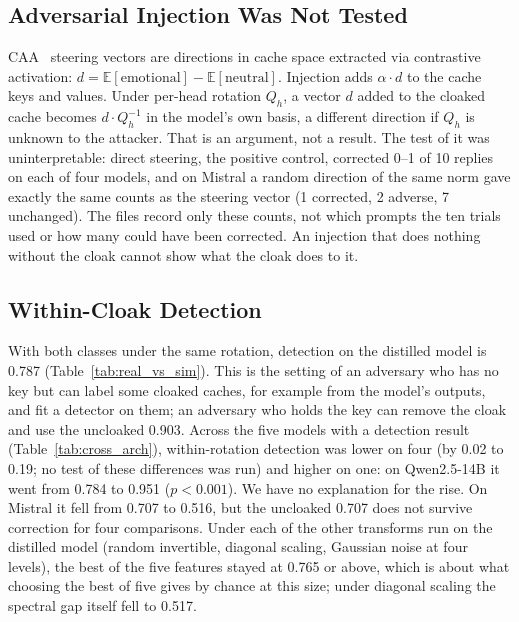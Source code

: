 \subsection{Adversarial Injection Was Not Tested}

CAA~\citep{panickssery2023caa} steering vectors are directions in cache space extracted via
contrastive activation: $d = \mathbb{E}[\text{emotional}] -
\mathbb{E}[\text{neutral}]$. Injection adds $\alpha \cdot d$ to the
cache keys and values. Under per-head rotation $Q_h$, a vector $d$ added
to the cloaked cache becomes $d \cdot Q_h^{-1}$ in the model's own basis,
a different direction if $Q_h$ is unknown to the attacker. That is an
argument, not a result. The test of it was uninterpretable: direct
steering, the positive control, corrected 0--1 of 10 replies on each of
four models, and on Mistral a random direction of the same norm gave
exactly the same counts as the steering vector (1 corrected, 2 adverse,
7 unchanged). The files record only these counts, not which prompts the
ten trials used or how many could have been corrected. An injection that
does nothing without the cloak cannot show what the cloak does to it.

\subsection{Within-Cloak Detection}
\label{sec:withincloak}

With both classes under the same rotation, detection on the distilled
model is 0.787 (Table~\ref{tab:real_vs_sim}). This is the setting of an
adversary who has no key but can label some cloaked caches, for example
from the model's outputs, and fit a detector on them; an adversary who
holds the key can remove the cloak and use the uncloaked 0.903. Across the
five models with a detection result (Table~\ref{tab:cross_arch}),
within-rotation detection was lower on four (by 0.02 to 0.19; no test of
these differences was run) and higher on one: on Qwen2.5-14B it went from
0.784 to 0.951 ($p < 0.001$). We have no explanation for the rise. On
Mistral it fell from 0.707 to 0.516, but the uncloaked 0.707 does not
survive correction for four comparisons. Under each of the other
transforms run on the distilled model (random invertible, diagonal
scaling, Gaussian noise at four levels), the best of the five features
stayed at 0.765 or above, which is about what choosing the best of five
gives by chance at this size; under diagonal scaling the spectral gap
itself fell to 0.517.

